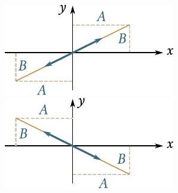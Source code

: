 \begin{figure}[!htb]
	\begin{minipage}[t]{0.5\linewidth}
		\begin{center}
			\includegraphics[scale=0.95]{figures/ch_07/fig_7_13.pdf}
			\caption[]{}
			\label{fig:7_13}
		\end{center}
	\end{minipage}
	\hspace{-0.0cm}
	\begin{minipage}[t]{0.5\linewidth}
		\begin{center}
			\includegraphics[scale=0.95]{figures/ch_07/fig_7_14.pdf}
			\caption[]{}
			\label{fig:7_14}
		\end{center}
	\end{minipage}
\end{figure}

